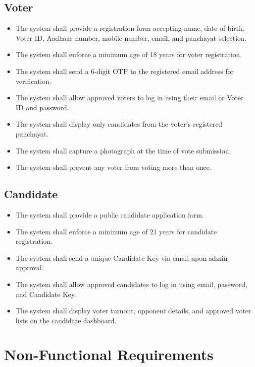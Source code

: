 \subsection{Voter}
\begin{itemize}
    \item The system shall provide a registration form accepting name, date of birth, Voter ID, Aadhaar number, mobile number, email, and panchayat selection.
    \item The system shall enforce a minimum age of 18 years for voter registration.
    \item The system shall send a 6-digit OTP to the registered email address for verification.
    \item The system shall allow approved voters to log in using their email or Voter ID and password.
    \item The system shall display only candidates from the voter's registered panchayat.
    \item The system shall capture a photograph at the time of vote submission.
    \item The system shall prevent any voter from voting more than once.
\end{itemize}

\subsection{Candidate}
\begin{itemize}
    \item The system shall provide a public candidate application form.
    \item The system shall enforce a minimum age of 21 years for candidate registration.
    \item The system shall send a unique Candidate Key via email upon admin approval.
    \item The system shall allow approved candidates to log in using email, password, and Candidate Key.
    \item The system shall display voter turnout, opponent details, and approved voter lists on the candidate dashboard.
\end{itemize}

\section{Non-Functional Requirements}

